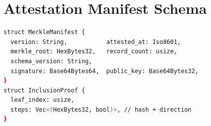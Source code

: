 \newpage
\section{Attestation Manifest Schema}
\label{app:api}

\begin{lstlisting}[language=bash,caption={Attestation manifest (\texttt{MerkleManifest}) and inclusion-proof types. The Rust signature covers a domain prefix and delimiter-separated schema version, record count, and root. Timestamp and version are unsigned metadata.}]
struct MerkleManifest {
  version: String,           attested_at: Iso8601,
  merkle_root: HexBytes32,   record_count: usize,
  schema_version: String,
  signature: Base64Bytes64,  public_key: Base64Bytes32,
}
struct InclusionProof {
  leaf_index: usize,
  steps: Vec<(HexBytes32, bool)>, // hash + direction
}
\end{lstlisting}
